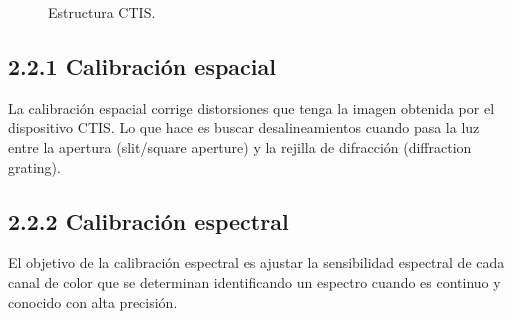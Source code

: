 \begin{figure}[h]
  \centering
  \centering
  \caption{Estructura CTIS. \cite{PracCam}}
  \label{fCTIS}
\end{figure}

\subsection{2.2.1 Calibración espacial}

La calibración espacial corrige distorsiones que tenga la imagen obtenida por el dispositivo CTIS. Lo que hace es buscar desalineamientos cuando pasa la luz entre la apertura (slit/square aperture) y la rejilla de difracción (diffraction grating).

\subsection{2.2.2 Calibración espectral}

El objetivo de la calibración espectral es ajustar la sensibilidad espectral de cada canal de color que se determinan identificando un espectro cuando es continuo y conocido con alta precisión.

